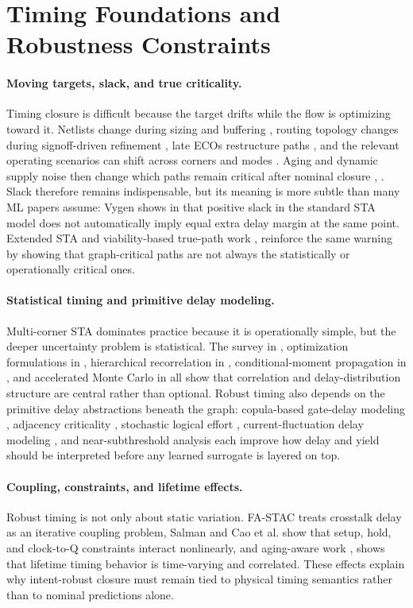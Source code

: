 \documentclass[num-refs]{wiley-article}
\begin{document}
    \section{Timing Foundations and Robustness Constraints}

    \paragraph{Moving targets, slack, and true criticality.} Timing closure is difficult because the target drifts while the flow is optimizing toward it. Netlists change during sizing and buffering \cite{ref1}, routing topology changes during signoff-driven refinement \cite{ref7}, late ECOs restructure paths \cite{ref19}, and the relevant operating scenarios can shift across corners and modes \cite{ref16}. Aging and dynamic supply noise then change which paths remain critical after nominal closure \cite{ref12}, \cite{ref23}. Slack therefore remains indispensable, but its meaning is more subtle than many ML papers assume: Vygen shows in \cite{ref50} that positive slack in the standard STA model does not automatically imply equal extra delay margin at the same point. Extended STA and viability-based true-path work \cite{ref37}, \cite{ref40} reinforce the same warning by showing that graph-critical paths are not always the statistically or operationally critical ones.


    \paragraph{Statistical timing and primitive delay modeling.} Multi-corner STA dominates practice because it is operationally simple, but the deeper uncertainty problem is statistical. The survey in \cite{ref49}, optimization formulations in \cite{ref18}, hierarchical recorrelation in \cite{ref43}, conditional-moment propagation in \cite{ref45}, and accelerated Monte Carlo in \cite{ref47} all show that correlation and delay-distribution structure are central rather than optional. Robust timing also depends on the primitive delay abstractions beneath the graph: copula-based gate-delay modeling \cite{ref32}, adjacency criticality \cite{ref35}, stochastic logical effort \cite{ref41}, current-fluctuation delay modeling \cite{ref42}, and near-subthreshold analysis \cite{ref36} each improve how delay and yield should be interpreted before any learned surrogate is layered on top.


    \paragraph{Coupling, constraints, and lifetime effects.} Robust timing is not only about static variation. FA-STAC \cite{ref48} treats crosstalk delay as an iterative coupling problem, Salman \cite{ref46} and Cao et al. \cite{ref31} show that setup, hold, and clock-to-Q constraints interact nonlinearly, and aging-aware work \cite{ref38}, \cite{ref44} shows that lifetime timing behavior is time-varying and correlated. These effects explain why intent-robust closure must remain tied to physical timing semantics rather than to nominal predictions alone.
\end{document}
